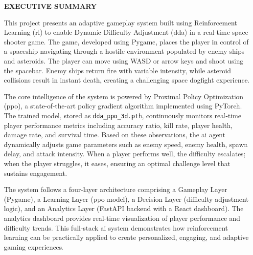 \begin{center}
	\Large{\textbf{EXECUTIVE SUMMARY}}	
\end{center}
\vspace{1em}
\normalsize
\hspace{1cm} This project presents an adaptive gameplay system built using Reinforcement Learning (\ac{rl}) to enable Dynamic Difficulty Adjustment (\ac{dda}) in a real-time space shooter game. The game, developed using Pygame, places the player in control of a spaceship navigating through a hostile environment populated by enemy ships and asteroids. The player can move using WASD or arrow keys and shoot using the spacebar. Enemy ships return fire with variable intensity, while asteroid collisions result in instant death, creating a challenging space dogfight experience.

\hspace{1cm} The core intelligence of the system is powered by Proximal Policy Optimization (\ac{ppo}), a state-of-the-art policy gradient algorithm implemented using PyTorch. The trained model, stored as \texttt{dda\_ppo\_3d.pth}, continuously monitors real-time player performance metrics including accuracy ratio, kill rate, player health, damage rate, and survival time. Based on these observations, the \ac{ai} agent dynamically adjusts game parameters such as enemy speed, enemy health, spawn delay, and attack intensity. When a player performs well, the difficulty escalates; when the player struggles, it eases, ensuring an optimal challenge level that sustains engagement.

\hspace{1cm} The system follows a four-layer architecture comprising a Gameplay Layer (Pygame), a Learning Layer (\ac{ppo} model), a Decision Layer (difficulty adjustment logic), and an Analytics Layer (FastAPI backend with a React dashboard). The analytics dashboard provides real-time visualization of player performance and difficulty trends. This full-stack \ac{ai} system demonstrates how reinforcement learning can be practically applied to create personalized, engaging, and adaptive gaming experiences.
